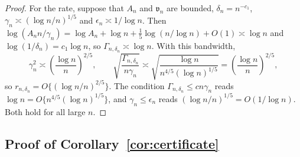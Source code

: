 \documentclass{article} %
\begin{document}
\begin{proof}
For the rate, suppose that $A_n$ and $\mathfrak{v}_n$ are bounded, $\delta_n=n^{-c_1}$, $\gamma_n\asymp(\log n/n)^{1/5}$ and $\epsilon_n\asymp1/\log n$.  Then $\log(A_nn/\gamma_n)=\log A_n+\log n+\tfrac{1}{5}\log(n/\log n)+O(1)\asymp\log n$ and $\log(1/\delta_n)=c_1\log n$, so $\Gamma_{n,\delta_n}\asymp\log n$.  With this bandwidth,
\[
  \gamma_n^2\asymp\left(\frac{\log n}{n}\right)^{2/5},
  \qquad
  \sqrt{\frac{\Gamma_{n,\delta_n}}{n\gamma_n}}
  \asymp\sqrt{\frac{\log n}{n^{4/5}(\log n)^{1/5}}}
  =\left(\frac{\log n}{n}\right)^{2/5},
\]
so $r_{n,\delta_n}=O\{(\log n/n)^{2/5}\}$.  The condition $\Gamma_{n,\delta_n}\le cn\gamma_n$ reads $\log n=O\{n^{4/5}(\log n)^{1/5}\}$, and $\gamma_n\le\epsilon_n$ reads $(\log n/n)^{1/5}=O(1/\log n)$.  Both hold for all large $n$.
\end{proof}

\subsection{Proof of Corollary~\ref{cor:certificate}}
\label{app:proof-certificate}
\end{document}
